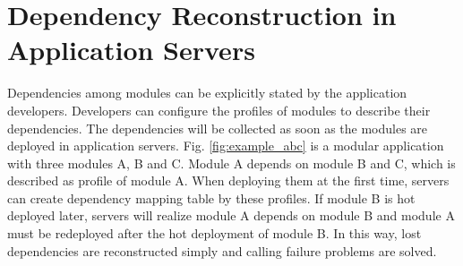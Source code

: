 \documentclass[conference]{IEEEtran}
\begin{document}







\section{Dependency Reconstruction in Application Servers\label{sec:reconstructionAS}}

Dependencies among modules can be explicitly stated by the application developers. Developers can configure the profiles of modules to describe their dependencies. The dependencies will be collected as soon as the modules are deployed in application servers. Fig. \ref{fig:example_abc} is a modular application with three modules A, B and C. Module A depends on module B and C, which is described as profile of module A. When deploying them at the first time, servers can create dependency mapping table by these profiles. If module B is hot deployed later, servers will realize module A depends on module B and module A must be redeployed after the hot deployment of module B. In this way, lost dependencies are reconstructed simply and calling failure problems are solved.
\end{document}
